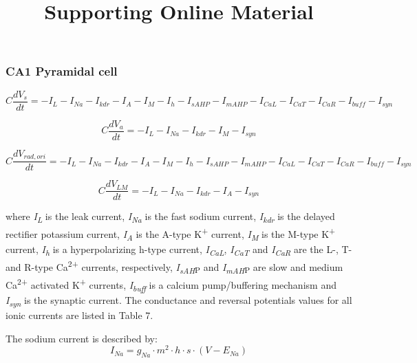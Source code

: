 \documentclass[a4paper]{article}
\title{Supporting Online Material}
\author{}
\begin{document}
\subsubsection{CA1 Pyramidal cell}


\begin{equation}
C\frac{dV_s}{dt}=-I_L-I_{Na}-I_{kdr}-I_A-I_M-I_h-I_{sAHP}-I_{mAHP}-I_{CaL}-I_{CaT}-I_{CaR}-I_{buff}-I_{syn}
\end{equation}

\begin{equation}
C\frac{dV_a}{dt}=-I_L-I_{Na}-I_{kdr}-I_M-I_{syn}
\end{equation}



\begin{equation}
C\frac{dV_{rad,ori}}{dt} =-I_L-I_{Na}-I_{kdr}-I_A-I_M-I_h-I_{sAHP}-I_{mAHP}-I_{CaL}-I_{CaT}-I_{CaR}-I_{buff}-I_{syn}
\end{equation}

\begin{equation}
C\frac{dV_{LM}}{dt}=-I_L-I_{Na}-I_{kdr}-I_A-I_{syn}
\end{equation}


where \textit{I}\textit{\textsubscript{L}} is the leak current, \textit{I}\textit{\textsubscript{Na}} is the fast sodium
current, \textit{I}\textit{\textsubscript{kdr}} is the delayed rectifier potassium current,
\textit{I}\textit{\textsubscript{A}} is the A-type K\textsuperscript{+} current, \textit{I}\textit{\textsubscript{M}}
is the M-type K\textsuperscript{+} current, \textit{I}\textit{\textsubscript{h}} is a hyperpolarizing h-type current,
\textit{I}\textit{\textsubscript{CaL}}, \textit{I}\textit{\textsubscript{CaT}} and
\textit{I}\textit{\textsubscript{CaR}} are the L-, T- and R-type Ca\textsuperscript{2+} currents, respectively,
\textit{I}\textit{\textsubscript{sAH}}\textsubscript{P} and \textit{I}\textit{\textsubscript{mAH}}\textsubscript{P} are
slow and medium Ca\textsuperscript{2+} activated K\textsuperscript{+} currents,\textit{ I}\textit{\textsubscript{buff}}
is a calcium pump/buffering mechanism and \textit{I}\textit{\textsubscript{syn}} is the synaptic current. The
conductance and reversal potentials values for all ionic currents are listed in Table 7.


The sodium current is described by:
\bigskip
\begin{equation}
I_{Na}= g_{Na}\cdot m^2\cdot h\cdot s\cdot (V-E_{Na})
\end{equation}


\bigskip
\end{document}

